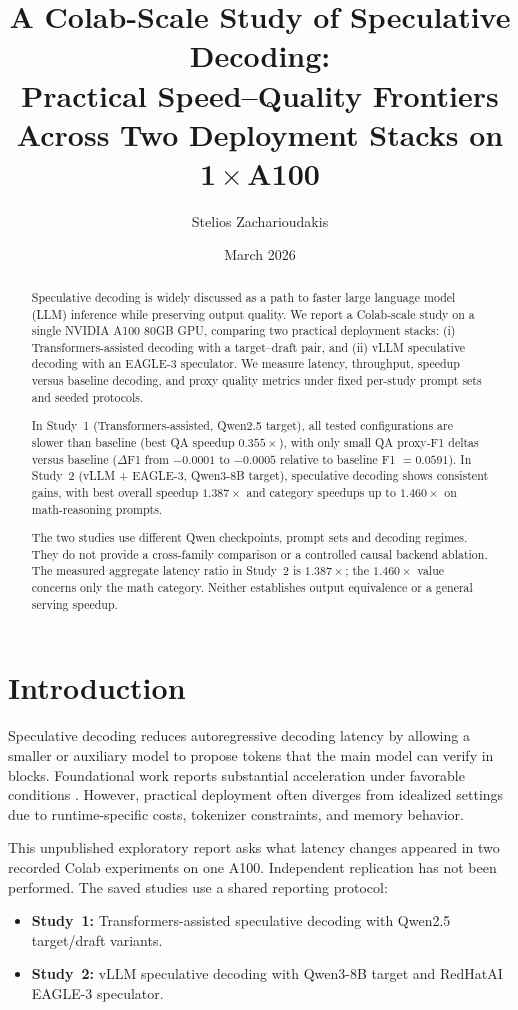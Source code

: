 \documentclass[11pt]{article}
\title{A Colab-Scale Study of Speculative Decoding:\\Practical Speed--Quality Frontiers Across Two Deployment Stacks on 1\,$\times$\,A100}
\author{Stelios Zacharioudakis}
\date{March 2026}
\begin{document}
\maketitle

\begin{abstract}
Speculative decoding is widely discussed as a path to faster large language model (LLM) inference while preserving output quality. We report a Colab-scale study on a single NVIDIA A100 80GB GPU, comparing two practical deployment stacks: (i) Transformers-assisted decoding with a target--draft pair, and (ii) vLLM speculative decoding with an EAGLE-3 speculator. We measure latency, throughput, speedup versus baseline decoding, and proxy quality metrics under fixed per-study prompt sets and seeded protocols.

In Study~1 (Transformers-assisted, Qwen2.5 target), all tested configurations are slower than baseline (best QA speedup $0.355\times$), with only small QA proxy-F1 deltas versus baseline ($\Delta$F1 from $-0.0001$ to $-0.0005$ relative to baseline F1 $=0.0591$). In Study~2 (vLLM + EAGLE-3, Qwen3-8B target), speculative decoding shows consistent gains, with best overall speedup $1.387\times$ and category speedups up to $1.460\times$ on math-reasoning prompts.

The two studies use different Qwen checkpoints, prompt sets and decoding regimes. They do not provide a cross-family comparison or a controlled causal backend ablation. The measured aggregate latency ratio in Study~2 is $1.387\times$; the $1.460\times$ value concerns only the math category. Neither establishes output equivalence or a general serving speedup.
\end{abstract}

\section{Introduction}
Speculative decoding reduces autoregressive decoding latency by allowing a smaller or auxiliary model to propose tokens that the main model can verify in blocks. Foundational work reports substantial acceleration under favorable conditions \cite{leviathan2023fast,chen2023speculative}. However, practical deployment often diverges from idealized settings due to runtime-specific costs, tokenizer constraints, and memory behavior.

This unpublished exploratory report asks what latency changes appeared in two recorded Colab experiments on one A100. Independent replication has not been performed. The saved studies use a shared reporting protocol:
\begin{itemize}[leftmargin=1.2em]
    \item \textbf{Study~1:} Transformers-assisted speculative decoding with Qwen2.5 target/draft variants.
    \item \textbf{Study~2:} vLLM speculative decoding with Qwen3-8B target and RedHatAI EAGLE-3 speculator.
\end{itemize}
\end{document}
